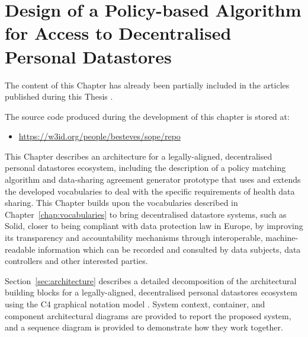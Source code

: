 \chapter{Design of a Policy-based Algorithm for Access to Decentralised Personal Datastores}
\label{chap:matching}

\begin{tcolorbox}[colback=royallavender!40]
The content of this Chapter has already been partially included in the articles published during this Thesis \citep{esteves_odrl_2021,esteves_using_2022}. %
\end{tcolorbox}

\begin{tcolorbox}[colback=royallavender!10]
The source code produced during the development of this chapter is stored at:
\begin{itemize}
    \item \url{https://w3id.org/people/besteves/sope/repo}
\end{itemize}
\end{tcolorbox}

This Chapter describes an architecture for a legally-aligned, decentralised personal datastores ecosystem, including the description of a policy matching algorithm and data-sharing agreement generator prototype that uses and extends the developed vocabularies to deal with the specific requirements of health data sharing.
This Chapter builds upon the vocabularies described in Chapter~\ref{chap:vocabularies} to bring decentralised datastore systems, such as Solid, closer to being compliant with data protection law in Europe, by improving its transparency and accountability mechanisms through interoperable, machine-readable information which can be recorded and consulted by data subjects, data controllers and other interested parties.

Section~\ref{sec:architecture} describes a detailed decomposition of the architectural building blocks for a legally-aligned, decentralised personal datastores ecosystem using the C4 graphical notation model \citep{brown_c4_2015}.
System context, container, and component architectural diagrams are provided to report the proposed system, and a sequence diagram is provided to demonstrate how they work together.

